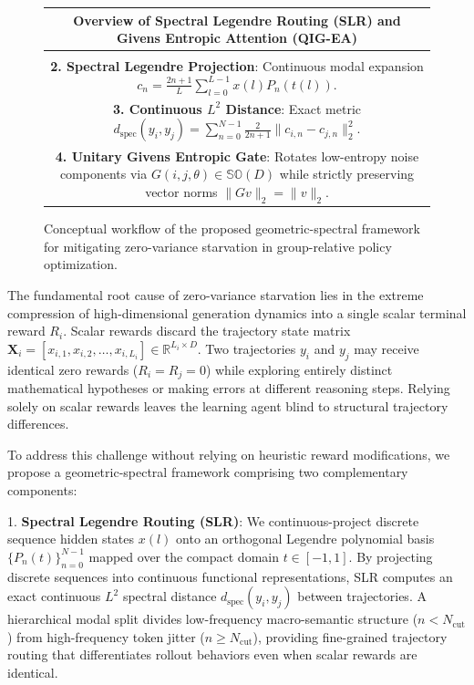 \documentclass{article}
\newcommand{\slr}{\textsc{SLR}\xspace}
\newcommand{\qigea}{\textsc{QIG-EA}\xspace}
\begin{document}
\begin{figure}[t]
  \centering
  \small
  \begin{tabular}{c}
    \textbf{Overview of Spectral Legendre Routing (\slr) and Givens Entropic Attention (\qigea)} \\
    \toprule
    \begin{minipage}{0.95\textwidth}
      \vspace{4pt}
      \textbf{1. Discrete-to-Continuous Mapping}: Sequences $x(l) \in \mathbb{R}^D \implies t(l) \in [-1, 1]$. \\
      \textbf{2. Spectral Legendre Projection}: Continuous modal expansion $c_n = \frac{2n+1}{L} \sum_{l=0}^{L-1} x(l) P_n(t(l))$. \\
      \textbf{3. Continuous $L^2$ Distance}: Exact metric $d_{\text{spec}}(y_i, y_j) = \sum_{n=0}^{N-1} \frac{2}{2n+1} \|c_{i,n} - c_{j,n}\|_2^2$. \\
      \textbf{4. Unitary Givens Entropic Gate}: Rotates low-entropy noise components via $G(i, j, \theta) \in \mathbb{SO}(D)$ while strictly preserving vector norms $\|G v\|_2 = \|v\|_2$.
      \vspace{4pt}
    \end{minipage} \\
    \bottomrule
  \end{tabular}
  \caption{Conceptual workflow of the proposed geometric-spectral framework for mitigating zero-variance starvation in group-relative policy optimization.}
  \label{fig:framework_overview}
\end{figure}

The fundamental root cause of zero-variance starvation lies in the extreme compression of high-dimensional generation dynamics into a single scalar terminal reward $R_i$. Scalar rewards discard the trajectory state matrix $\mathbf{X}_i = [x_{i,1}, x_{i,2}, \dots, x_{i,L_i}] \in \mathbb{R}^{L_i \times D}$. Two trajectories $y_i$ and $y_j$ may receive identical zero rewards ($R_i = R_j = 0$) while exploring entirely distinct mathematical hypotheses or making errors at different reasoning steps. Relying solely on scalar rewards leaves the learning agent blind to structural trajectory differences.

To address this challenge without relying on heuristic reward modifications, we propose a geometric-spectral framework comprising two complementary components:

1. \textbf{Spectral Legendre Routing (\slr)}: We continuous-project discrete sequence hidden states $x(l)$ onto an orthogonal Legendre polynomial basis $\{P_n(t)\}_{n=0}^{N-1}$ mapped over the compact domain $t \in [-1, 1]$. By projecting discrete sequences into continuous functional representations, \slr computes an exact continuous $L^2$ spectral distance $d_{\text{spec}}(y_i, y_j)$ between trajectories. A hierarchical modal split divides low-frequency macro-semantic structure ($n < N_{\text{cut}}$) from high-frequency token jitter ($n \ge N_{\text{cut}}$), providing fine-grained trajectory routing that differentiates rollout behaviors even when scalar rewards are identical.
\end{document}

